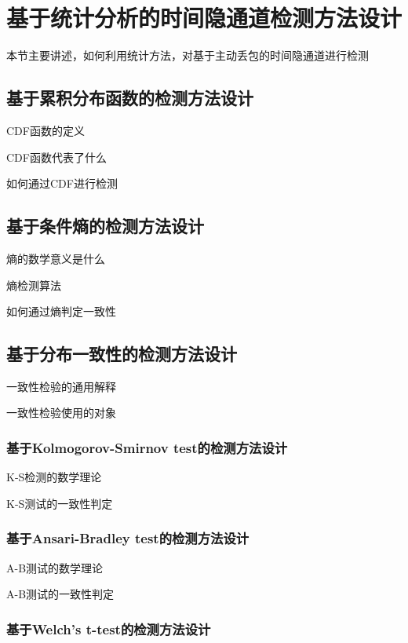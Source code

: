 \section{基于统计分析的时间隐通道检测方法设计}
\label{chap:analyze:statistical}

本节主要讲述，如何利用统计方法，对基于主动丢包的时间隐通道进行检测

\subsection{基于累积分布函数的检测方法设计}
\label{chap:analyze:statistical:cdf}

CDF函数的定义

CDF函数代表了什么

如何通过CDF进行检测

\subsection{基于条件熵的检测方法设计}
\label{chap:analyze:statistical:entropy}

熵的数学意义是什么

熵检测算法

如何通过熵判定一致性

\subsection{基于分布一致性的检测方法设计}
\label{chap:analyze:statistical:test}

一致性检验的通用解释

一致性检验使用的对象

\subsubsection{基于Kolmogorov-Smirnov test的检测方法设计}
\label{chap:analyze:statistical:test:ks}

K-S检测的数学理论

K-S测试的一致性判定

\subsubsection{基于Ansari-Bradley test的检测方法设计}
\label{chap:analyze:statistical:test:an}

A-B测试的数学理论

A-B测试的一致性判定

\subsubsection{基于Welch’s t-test的检测方法设计}
\label{chap:analyze:statistical:test:t}

